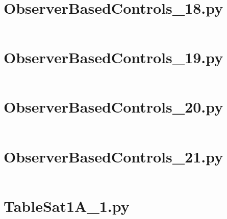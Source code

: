 \pagebreak
\section*{ObserverBasedControls\_18.py}\label{code:TSatPySamples/ObserverBasedControls_18.py}\inputminted[linenos,fontsize=\scriptsize]{python}{/home/dcouture/git/mathyourlife/TSatPy/tex/sample_scripts/ObserverBasedControls_18.py}

\pagebreak
\section*{ObserverBasedControls\_19.py}\label{code:TSatPySamples/ObserverBasedControls_19.py}\inputminted[linenos,fontsize=\scriptsize]{python}{/home/dcouture/git/mathyourlife/TSatPy/tex/sample_scripts/ObserverBasedControls_19.py}

\pagebreak
\section*{ObserverBasedControls\_20.py}\label{code:TSatPySamples/ObserverBasedControls_20.py}\inputminted[linenos,fontsize=\scriptsize]{python}{/home/dcouture/git/mathyourlife/TSatPy/tex/sample_scripts/ObserverBasedControls_20.py}

\pagebreak
\section*{ObserverBasedControls\_21.py}\label{code:TSatPySamples/ObserverBasedControls_21.py}\inputminted[linenos,fontsize=\scriptsize]{python}{/home/dcouture/git/mathyourlife/TSatPy/tex/sample_scripts/ObserverBasedControls_21.py}

\pagebreak
\section*{TableSat1A\_1.py}\label{code:TSatPySamples/TableSat1A_1.py}\inputminted[linenos,fontsize=\scriptsize]{python}{/home/dcouture/git/mathyourlife/TSatPy/tex/sample_scripts/TableSat1A_1.py}
